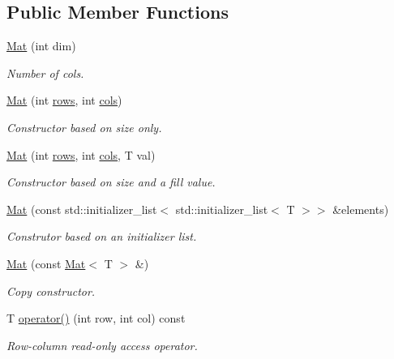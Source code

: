 \subsection*{Public Member Functions}
\begin{DoxyCompactItemize}
\item 
\mbox{\hyperlink{classtao_1_1_mat_a22ea16d2a3e3a1da5eb7de57e5bf02c2}{Mat}} (int dim)
\begin{DoxyCompactList}\small\item\em Number of cols. \end{DoxyCompactList}\item 
\mbox{\hyperlink{classtao_1_1_mat_a8b2f68a1f5539462e6f4186bc5f8a5c7}{Mat}} (int \mbox{\hyperlink{classtao_1_1_mat_adba65952e3b69680bd1d9f6477c20d7d}{rows}}, int \mbox{\hyperlink{classtao_1_1_mat_a80e80ef1ee80e33719d9637153186ee4}{cols}})
\begin{DoxyCompactList}\small\item\em Constructor based on size only. \end{DoxyCompactList}\item 
\mbox{\hyperlink{classtao_1_1_mat_a83589751aea3dcecc363068fd540a930}{Mat}} (int \mbox{\hyperlink{classtao_1_1_mat_adba65952e3b69680bd1d9f6477c20d7d}{rows}}, int \mbox{\hyperlink{classtao_1_1_mat_a80e80ef1ee80e33719d9637153186ee4}{cols}}, T val)
\begin{DoxyCompactList}\small\item\em Constructor based on size and a fill value. \end{DoxyCompactList}\item 
\mbox{\hyperlink{classtao_1_1_mat_a2c26859cc4b8bf40eb26dd4335f2d3c0}{Mat}} (const std\+::initializer\+\_\+list$<$ std\+::initializer\+\_\+list$<$ T $>$$>$ \&elements)
\begin{DoxyCompactList}\small\item\em Construtor based on an initializer list. \end{DoxyCompactList}\item 
\mbox{\hyperlink{classtao_1_1_mat_a74c591cbc3893506d9f97cf9f54e7adf}{Mat}} (const \mbox{\hyperlink{classtao_1_1_mat}{Mat}}$<$ T $>$ \&)
\begin{DoxyCompactList}\small\item\em Copy constructor. \end{DoxyCompactList}\item 
T \mbox{\hyperlink{classtao_1_1_mat_a814d02bbf96dab62938912f792aa7994}{operator()}} (int row, int col) const
\begin{DoxyCompactList}\small\item\em Row-\/column read-\/only access operator. \end{DoxyCompactList}\item 
$$
\end{DoxyCompactItemize}
